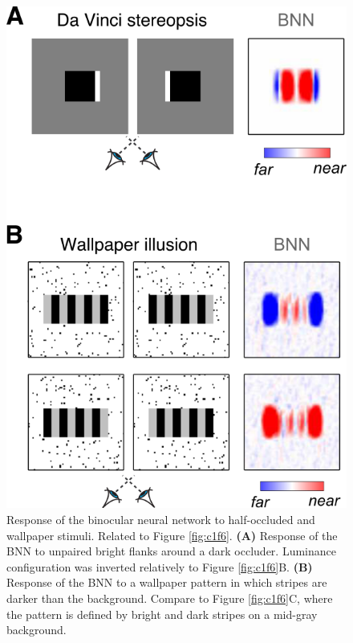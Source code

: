 \begin{figure}[!h]
  \centering
  \includegraphics{FigS5.png}
  \caption[Half-occlusions and ambiguous stimuli.]{Response of the binocular neural network to half-occluded and wallpaper stimuli. Related to Figure \ref{fig:c1f6}. \textbf{(A)} Response of the BNN to unpaired bright flanks around a dark occluder. Luminance configuration was inverted relatively to Figure \ref{fig:c1f6}B. \textbf{(B)} Response of the BNN to a wallpaper pattern in which stripes are darker than the background. Compare to Figure \ref{fig:c1f6}C, where the pattern is defined by bright and dark stripes on a mid-gray background.}
  \label{fig:c1fs5}
\end{figure}

